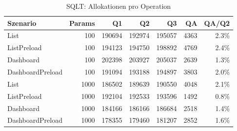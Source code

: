 \begin{table}[ht]
\centering
\caption{SQLT: Allokationen pro Operation}
\begin{tabular}{lrrrrrr}
\toprule
Szenario & Params & Q1 & Q2 & Q3 & QA & QA/Q2 \\
\midrule
		List & 100 & 190694 & 192974 & 195057 & 4363 & 2.3\% \\
		ListPreload & 100 & 194123 & 194750 & 198892 & 4769 & 2.4\% \\
		Dashboard & 100 & 202398 & 203927 & 205037 & 2639 & 1.3\% \\
		DashboardPreload & 100 & 191094 & 193188 & 194897 & 3803 & 2.0\% \\
		List & 1000 & 186502 & 189639 & 190550 & 4048 & 2.1\% \\
		ListPreload & 1000 & 192104 & 192533 & 193596 & 1492 & 0.8\% \\
		Dashboard & 1000 & 184166 & 186166 & 186684 & 2518 & 1.4\% \\
		DashboardPreload & 1000 & 178355 & 179460 & 181207 & 2852 & 1.6\% \\
\bottomrule
\end{tabular}
\label{tab:benchmark_sqlt_allocsperop}
\end{table}
	